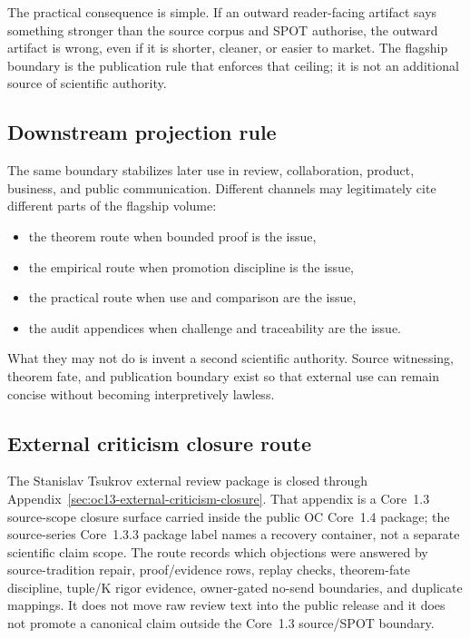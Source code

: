 The practical consequence is simple. If an outward reader-facing artifact says
something stronger than the source corpus and SPOT authorise, the outward
artifact is wrong, even if it is shorter, cleaner, or easier to market. The
flagship boundary is the publication rule that enforces that ceiling; it is
not an additional source of scientific authority.

\subsection{Downstream projection rule}

The same boundary stabilizes later use in review, collaboration, product,
business, and public communication. Different channels may legitimately cite
different parts of the flagship volume:

\begin{itemize}
\item the theorem route when bounded proof is the issue,
\item the empirical route when promotion discipline is the issue,
\item the practical route when use and comparison are the issue,
\item the audit appendices when challenge and traceability are the issue.
\end{itemize}

What they may not do is invent a second scientific authority. Source witnessing,
theorem fate, and publication boundary exist so that external use can remain
concise without becoming interpretively lawless.

\subsection{External criticism closure route}
\label{sec:oc13-source-audit-external-criticism-closure}

The Stanislav Tsukrov external review package is closed through Appendix~\ref{sec:oc13-external-criticism-closure}. That appendix is a Core~1.3 source-scope closure surface carried inside the public OC Core~1.4 package; the source-series Core~1.3.3 package label names a recovery container, not a separate scientific claim scope. The route records which objections were answered by source-tradition repair, proof/evidence rows, replay checks, theorem-fate discipline, tuple/K rigor evidence, owner-gated no-send boundaries, and duplicate mappings. It does not move raw review text into the public release and it does not promote a canonical claim outside the Core~1.3 source/SPOT boundary.

